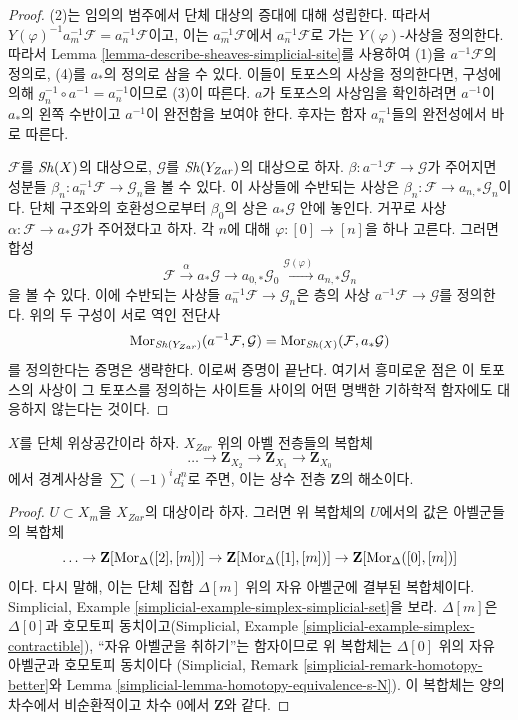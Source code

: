 \begin{proof}
(2)는 임의의 범주에서 단체 대상의 증대에 대해 성립한다.
따라서 $Y(\varphi)^{-1} a_m^{-1} \mathcal{F} = a_n^{-1}\mathcal{F}$이고,
이는 $a_m^{-1}\mathcal{F}$에서 $a_n^{-1}\mathcal{F}$로 가는
$Y(\varphi)$-사상을 정의한다.
따라서 Lemma \ref{lemma-describe-sheaves-simplicial-site}를 사용하여
(1)을 $a^{-1}\mathcal{F}$의 정의로, (4)를 $a_*$의 정의로 삼을 수 있다.
이들이 토포스의 사상을 정의한다면, 구성에 의해
$g_n^{-1} \circ a^{-1} = a_n^{-1}$이므로 (3)이 따른다.
$a$가 토포스의 사상임을 확인하려면 $a^{-1}$이 $a_*$의 왼쪽 수반이고
$a^{-1}$이 완전함을 보여야 한다. 후자는 함자 $a_n^{-1}$들의
완전성에서 바로 따른다.

\medskip\noindent
$\mathcal{F}$를 $\mathop{\mathit{Sh}}\nolimits(X)$의 대상으로, $\mathcal{G}$를
$\mathop{\mathit{Sh}}\nolimits(Y_{Zar})$의 대상으로 하자.
$\beta : a^{-1}\mathcal{F} \to \mathcal{G}$가 주어지면 성분들
$\beta_n : a_n^{-1}\mathcal{F} \to \mathcal{G}_n$을 볼 수 있다.
이 사상들에 수반되는 사상은
$\beta_n : \mathcal{F} \to a_{n, *}\mathcal{G}_n$이다.
단체 구조와의 호환성으로부터 $\beta_0$의 상은
$a_*\mathcal{G}$ 안에 놓인다.
거꾸로 사상 $\alpha : \mathcal{F} \to a_*\mathcal{G}$가 주어졌다고 하자.
각 $n$에 대해 $\varphi : [0] \to [n]$을 하나 고른다. 그러면 합성
$$
\mathcal{F} \xrightarrow{\alpha} a_*\mathcal{G}
\to a_{0, *}\mathcal{G}_0 \xrightarrow{\mathcal{G}(\varphi)}
a_{n, *}\mathcal{G}_n
$$
을 볼 수 있다. 이에 수반되는 사상들
$a_n^{-1}\mathcal{F} \to \mathcal{G}_n$은 층의 사상
$a^{-1}\mathcal{F} \to \mathcal{G}$를 정의한다.
위의 두 구성이 서로 역인 전단사
$$
\mathop{\mathrm{Mor}}\nolimits_{\mathop{\mathit{Sh}}\nolimits(Y_{Zar})}(a^{-1}\mathcal{F}, \mathcal{G}) =
\mathop{\mathrm{Mor}}\nolimits_{\mathop{\mathit{Sh}}\nolimits(X)}(\mathcal{F}, a_*\mathcal{G})
$$
를 정의한다는 증명은 생략한다.
이로써 증명이 끝난다. 여기서 흥미로운 점은 이 토포스의 사상이
그 토포스를 정의하는 사이트들 사이의 어떤 명백한 기하학적 함자에도
대응하지 않는다는 것이다.
\end{proof}

\begin{lemma}
\label{lemma-simplicial-resolution-Z}
$X$를 단체 위상공간이라 하자. $X_{Zar}$ 위의 아벨 전층들의 복합체
$$
\ldots \to \mathbf{Z}_{X_2} \to \mathbf{Z}_{X_1} \to \mathbf{Z}_{X_0}
$$
에서 경계사상을 $\sum (-1)^i d^n_i$로 주면,
이는 상수 전층 $\mathbf{Z}$의 해소이다.
\end{lemma}

\begin{proof}
$U \subset X_m$을 $X_{Zar}$의 대상이라 하자. 그러면 위 복합체의
$U$에서의 값은 아벨군들의 복합체
$$
\ldots \to
\mathbf{Z}[\mathop{\mathrm{Mor}}\nolimits_\Delta([2], [m])] \to
\mathbf{Z}[\mathop{\mathrm{Mor}}\nolimits_\Delta([1], [m])] \to
\mathbf{Z}[\mathop{\mathrm{Mor}}\nolimits_\Delta([0], [m])]
$$
이다. 다시 말해, 이는 단체 집합 $\Delta[m]$ 위의 자유 아벨군에
결부된 복합체이다. Simplicial, Example
\ref{simplicial-example-simplex-simplicial-set}을 보라.
$\Delta[m]$은 $\Delta[0]$과 호모토피 동치이고(Simplicial, Example
\ref{simplicial-example-simplex-contractible}),
“자유 아벨군을 취하기”는 함자이므로 위 복합체는
$\Delta[0]$ 위의 자유 아벨군과 호모토피 동치이다
(Simplicial, Remark \ref{simplicial-remark-homotopy-better}와
Lemma \ref{simplicial-lemma-homotopy-equivalence-s-N}).
이 복합체는 양의 차수에서 비순환적이고 차수 $0$에서
$\mathbf{Z}$와 같다.
\end{proof}

